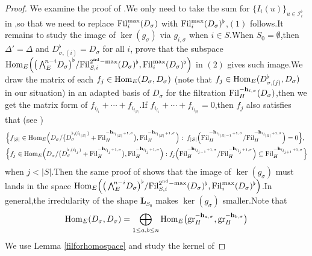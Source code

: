\documentclass[10pt]{article}
\newcommand{\fil}{{\rm Fil}}
\newcommand{\homo}{{\rm Hom}}
\newcommand{\gr}{{\rm gr}}
\newcommand{\bL}{{\mathbf{L}}}
\newcommand{\bh}{{\mathbf{h}}}
\newcommand{\cI}{\mathcal I}
\begin{document}
\begin{proof}
We examine the proof of \cite[Propositions 2.3.4 \& 2.3.7]{BDcritical25}.\;We only need to take the sum for $\{I_i(u)\}_{u\in \cI_i^{\flat}}$ in  \cite[(96)]{BDcritical25},\;so that we need to replace $\fil_i^{\max}(D_{\sigma})$ with $\fil_i^{\max}(D_{\sigma})^{\flat}$,\;$(1)$ follows.\;It remains to study the image of $\ker(g_{\sigma})$ via $g_{i,\sigma}$ when $i\in S$.\;When $S_0=\emptyset$,\;then $\Delta'=\Delta$ and $D_{\sigma,(i)}^{\flat}=D_{\sigma}$ for all $i$,\;\cite[Proposition 2.3.7]{BDcritical25} prove that the subspace $\homo_E\Big(\big(\bigwedge\nolimits_{E}^{\!n-i}\!D_{\sigma}\big)^{\flat}/\fil_{S,i}^{2^{\mathrm{nd}}-\max}(D_{\sigma})^{\flat},\fil_i^{\max}(D_{\sigma})^{\flat}\Big)$ in $(2)$ gives such image.\;We draw the matrix of each $f_j\in \homo_E(D_{\sigma},D_{\sigma})$ (note that $f_j\in \homo_E(D_{\sigma,(j)}^{\flat},D_{\sigma})$ in our situation) in an adapted basis of $D_{\sigma}$ for the filtration $\fil^{-\bh_{i,\sigma}}_H(D_{\sigma})$,\;then we get the matrix form of $f_{i_{l_1}}+\cdots+f_{i_{l_{|S|}}}$.\;If $f_{i_{l_1}}+\cdots+f_{i_{l_{|S|}}}=0$,\;then $f_{j}$ also satisfies that  (see \cite[(102)]{BDcritical25})
\begin{equation*}
	\begin{aligned}
		&\Big\{f_{|S|}\in \homo_E\Big(D_{\sigma}/\big(D_{\sigma}^{\flat,(i_{l_{|S|}})}+\fil_H^{-\bh_{i_{l_{|S|}}+1,\sigma}}\big),\fil_H^{-\bh_{i_{l_{|S|}}+1,\sigma}}\Big):\;f_{|S|}\Big(\fil_H^{-\bh_{i_{l_{|S|-1}}+1,\sigma}}/\fil_H^{-\bh_{i_{l_{|S|}}+1,\sigma}}\Big)=0\Big\},\\
		&\Big\{f_j\in\homo_E\Big(D_{\sigma}/\big(D_{\sigma}^{\flat,(i_{l_{j}})}+\fil_H^{-\bh_{i_{l_{j}}+1,\sigma}}\big),\fil_H^{-\bh_{i_{l_{j}}+1,\sigma}}\Big):f_j\Big(\fil_H^{-\bh_{i_{l_{j-1}}+1,\sigma}}/\fil_H^{-\bh_{i_{l_{j}}+1,\sigma}}\Big)\subseteq\fil_H^{-\bh_{i_{l_{j+1}}+1,\sigma}}\Big\}
	\end{aligned}
\end{equation*}
when $j<|S|$.\;Then the same proof of \cite[(102)]{BDcritical25} shows that the image of $\ker(g_{\sigma})$ must lands in the space $\homo_E\Big(\big(\bigwedge\nolimits_{E}^{\!n-i}\!D_{\sigma}\big)^{\flat}/\fil_{S,i}^{2^{\mathrm{nd}}-\max}(D_{\sigma})^{\flat},\fil_i^{\max}(D_{\sigma})^{\flat}\Big)$.\;In general,\;the irredularity of the shape $\bL_{S_0}$ makes $\ker(g_{\sigma})$ smaller.\;Note that
\[\homo_E(D_{\sigma},D_{\sigma})=\bigoplus_{1\leq a,b\leq n}\homo_E\big(\gr_H^{-\bh_{a,\sigma}},\gr_H^{-\bh_{b,\sigma}}\big)\]
We use Lemma \ref{filforhomospace} and study the kernel of 

\end{proof}
\end{document}
